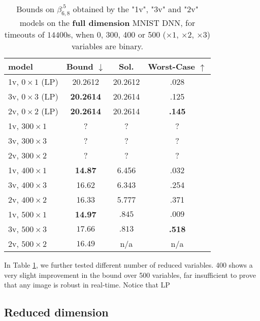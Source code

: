 	
	\begin{table}[h!]
		\centering
	\begin{tabular}{||l||c|c|c||}\hline\hline
		model &        Bound $\downarrow$ &  Sol. &      Worst-Case $\uparrow$ \\\hline \hline
		1v, $0 \times 1$ (LP) & 20.2612  & 20.2612  & .028 \\\hline 
		3v, $0 \times 3$ (LP) & {\bf 20.2614}  & 20.2614  & .125 \\\hline 
	    2v, $0 \times 2$ (LP) & {\bf 20.2614}  & 20.2614  & {\bf .145} \\\hline\hline	 

		1v, $300 \times 1$ & ? & ? & ? \\\hline 
		3v, $300 \times 3$ & ? & ? & ? \\\hline 
	    2v, $300 \times 2$ & ? & ? & ? \\\hline\hline	 

		1v, $400 \times 1$ & {\bf 14.87} & 6.456 & .032 \\\hline 
		3v, $400 \times 3$ & 16.62 & 6.343 & .254 \\\hline 
	    2v, $400 \times 2$ & 16.33 & 5.777 & .371 \\\hline \hline

		1v, $500 \times 1$ & {\bf 14.97} & $.845$ & $.009$ \\\hline 
		3v, $500 \times 3$ & $17.66$ & $.813$ & {\bf .518} \\\hline 
	    2v, $500 \times 2$ & $16.49$ & n/a & n/a \\\hline\hline	 
	\end{tabular}
	\caption{Bounds on $\beta^{.5}_{6,8}$ 
	obtained by the "1v", "3v" and "2v" models 
	on the {\bf full dimension} MNIST DNN, 
	for timeouts of $14400$s, when 0, 300, 400 or 500 ($\times 1$, $\times 2$, $\times 3$) variables are binary.}
	\label{table.mnist}
\end{table}

In Table \ref{table.mnist}, we further tested different number of reduced variables. 400 shows a very slight improvement in the bound over 500 variables, 
far insufficient to prove that any image is robust in real-time. Notice that LP

\subsection{Reduced dimension}

